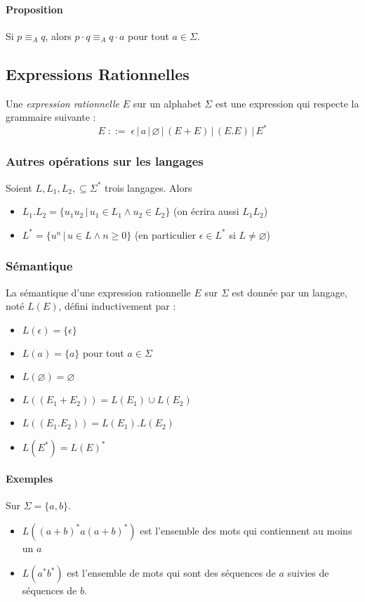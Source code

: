 \documentclass[a4paper]{article}
\begin{document}
  \paragraph{Proposition} Si $p \equiv_A q$, alors $p \cdot q \equiv_A q \cdot a$ pour tout $a \in \Sigma$.


  \subsection{Expressions Rationnelles}
  Une \textit{expression rationnelle} $E$ sur un alphabet $\Sigma$ est une expression
  qui respecte la grammaire suivante :
  $$ E\; ::=\; \epsilon\,|\, a\,|\,\varnothing\,|\, (E+E)\,|\, (E.E) \,|\, E^* $$

  \subsubsection{Autres opérations sur les langages}
  Soient $L, L_1, L_2, \subseteq \Sigma^*$ trois langages. Alors
  \begin{itemize}
    \item $L_1.L_2 = \{u_1u_2\, |\, u_1 \in L_1 \land u_2 \in L_2\}$ (on écrira aussi $L_1L_2$)
    \item $L^* = \{u^n\, |\, u \in L \land n \geq 0\}$ (en particulier $\epsilon \in L^*$ si $L \neq \varnothing$)
  \end{itemize}

  \subsubsection{Sémantique}
  La sémantique d'une expression rationnelle $E$ sur $\Sigma$ est donnée par un 
  langage, noté $L(E)$, défini inductivement par :
  \begin{itemize}
    \item $L(\epsilon) = \{\epsilon\}$
    \item $L(a) = \{a\}$ pour tout $a \in \Sigma$
    \item $L(\varnothing) = \varnothing$
    \item $L((E_1+E_2)) = L(E_1) \cup L(E_2)$
    \item $L((E_1.E_2)) = L(E_1) . L(E_2)$
    \item $L(E^*) = L(E)^*$
  \end{itemize}

  \paragraph{Exemples} Sur $\Sigma = \{a,b\}$.
  \begin{itemize}
    \item $L((a+b)^*a(a+b)^*)$ est l'ensemble des mots qui contiennent au moins un $a$
    \item $L(a^*b^*)$ est l'ensemble de mots qui sont des séquences de $a$ suivies 
    de séquences de $b$.
  \end{itemize}
\end{document}
